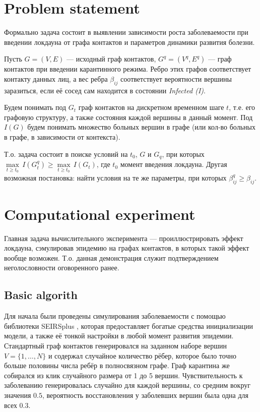 	\section*{Problem statement}
	
	Формально задача состоит в выявлении зависимости роста заболеваемости при введении локдауна от графа контактов и параметров динамики развития болезни.
	
	Пусть $ G = (V, E) $ --- исходный граф контактов, $ G^q = (V^q, E^q) $ --- граф контактов при введении карантинного режима. Ребро этих графов соответствует контакту данных лиц, а вес ребра $ \beta_{ij} $ соответствует вероятности вершины заразиться, если её сосед сам находится в состоянии \textit{Infected (I)}. 
	
	Будем понимать под $ G_t $ граф контактов на дискретном временном шаге $ t $, т.е. его графовую структуру, а также состояния каждой вершины в данный момент. Под $ I(G) $ будем понимать множество больных вершин в графе (или кол-во больных в графе, в зависимости от контекста). 
	
	Т.о. задача состоит в поиске условий на $ t_0 $, $ G $ и $ G_q $, при которых $ \underset{t \ge t_0}{\max} \, I(G^q_t) \ge \underset{t \ge t_0}{\max} \, I(G_t) $, где $ t_0 $ момент введения локдауна. Другая возможная постановка: найти условия на те же параметры, при которых $ \beta_{ij}^q \ge \beta_{ij} $.
	
	\section{Computational experiment}
	
	Главная задача вычислительного эксперимента --- проиллюстрировать эффект локдауна, сэмулировав эпидемию на графах контактов, в которых такой эффект вообще возможен. Т.о. данная демонстрация служит подтверждением неголословности оговоренного ранее.
	
	\subsection*{Basic algorith}
	
	Для начала были проведены симулирования заболеваемости с помощью библиотеки SEIRSplus \cite{seirsplus}, которая предоставляет богатые средства инициализации модели, а также её тонкой настройки в любой момент развития эпидемии. Стандартный граф контактов генерировался на заданном наборе вершин $ V = \{1, \ldots, N\} $ и содержал случайное количество рёбер, которое было точно больше половины числа ребёр в полносвязном графе. Граф карантина же собирался из клик случайного размера от 1 до 5 вершин. Чувствительность к заболеванию генерировалась случайно для каждой вершины, со средним вокруг значения $ 0.5 $, вероятность восстановления у заболевших вершин была одна для всех $ 0.3 $. 
	
